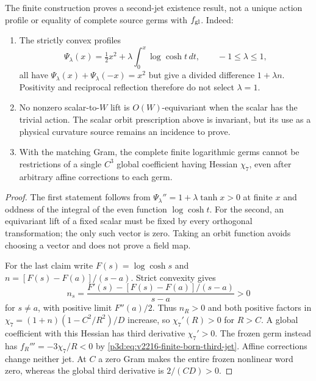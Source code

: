 \documentclass[12pt,a4paper]{article}
\begin{document}
\begin{proposition}
\label{p3d:prop:v2216-finite-born-limits}
The finite construction proves a second-jet existence result, not a unique
action profile or equality of complete source germs with $f_{\rm gl}$.
Indeed:
\begin{enumerate}
\item The strictly convex profiles
\[
 \Psi_\lambda(x)=\tfrac12x^2+
       \lambda\int_0^x\log\cosh t\,dt,\qquad -1\le\lambda\le1,
\]
all have $\Psi_\lambda(x)+\Psi_\lambda(-x)=x^2$ but give a divided
difference $1+\lambda n$. Positivity and reciprocal reflection therefore
do not select $\lambda=1$.
\item No nonzero scalar-to-$W$ lift is $O(W)$-equivariant when the scalar
has the trivial action. The scalar orbit prescription above is invariant,
but its use as a physical curvature source remains an incidence to prove.
\item With the matching Gram, the complete finite logarithmic germs cannot
be restrictions of a single $C^3$ global coefficient having Hessian
$\chi_7$, even after arbitrary affine corrections to each germ.
\end{enumerate}
\end{proposition}
\begin{proof}
The first statement follows from
$\Psi_\lambda''=1+\lambda\tanh x>0$ at finite $x$ and oddness of the
integral of the even function $\log\cosh t$. For the second, an
equivariant lift of a fixed scalar must be fixed by every orthogonal
transformation; the only such vector is zero. Taking an orbit function
avoids choosing a vector and does not prove a field map.

For the last claim write $F(s)=\log\cosh s$ and
$n=[F(s)-F(a)]/(s-a)$. Strict convexity gives
\[
 n_s=\frac{F'(s)-[F(s)-F(a)]/(s-a)}{s-a}>0
\]
for $s\ne a$, with positive limit $F''(a)/2$. Thus $n_R>0$ and
both positive factors in
$\chi_7=(1+n)(1-C^2/R^2)/D$ increase, so $\chi_7'(R)>0$ for $R>C$.
A global coefficient with this Hessian has third derivative
$\chi_7'>0$. The frozen germ instead has $f_R'''=-3\chi_7/R<0$ by
\eqref{p3d:eq:v2216-finite-born-third-jet}. Affine corrections change
neither jet. At $C$ a zero Gram makes the entire frozen nonlinear word
zero, whereas the global third derivative is $2/(CD)>0$.
\end{proof}
\end{document}
